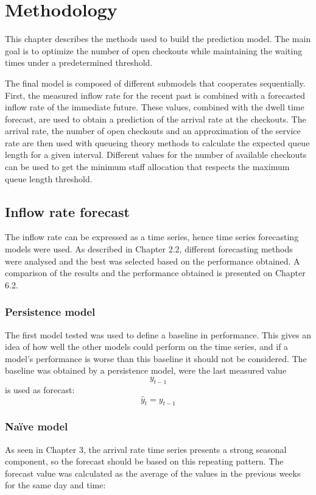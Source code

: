 \chapter{Methodology}
\label{cha:methodology}

This chapter describes the methods used to build the prediction model. The main goal is to optimize the number of open checkouts while maintaining the waiting times under a predetermined threshold.

The final model is composed of different submodels that cooperates sequentially. First, the measured inflow rate for the recent past is combined with a forecasted inflow rate of the immediate future. These values, combined with the dwell time forecast, are used to obtain a prediction of the arrival rate at the checkouts. The arrival rate, the number of open checkouts and an approximation of the service rate are then used with queueing theory methods to calculate the expected queue length for a given interval. Different values for the number of available checkouts can be used to get the minimum staff allocation that respects the maximum queue length threshold.

\section{Inflow rate forecast}
\label{sec:inflow_rate_forecast}

The inflow rate can be expressed as a time series, hence time series forecasting models were used. As described in Chapter 2.2, different forecasting methods were analysed and the best was selected based on the performance obtained. A comparison of the results and the performance obtained is presented on Chapter 6.2.

\subsection{Persistence model}
\label{subsec:persistence_model}
The first model tested was used to define a baseline in performance. This gives an idea of how well the other models could perform on the time series, and if a model’s performance is worse than this baseline it should not be considered. The baseline was obtained by a persistence model, were the last measured value $$ y_{t-1} $$ is used as forecast:
$$ \hat{y}_t = y_{t-1} $$

\subsection{Naïve model}
\label{subsec:naive_model}
As seen in Chapter 3, the arrival rate time series presents a strong seasonal component, so the forecast should be based on this repeating pattern. The forecast value was calculated as the average of the values in the previous weeks for the same day and time:

